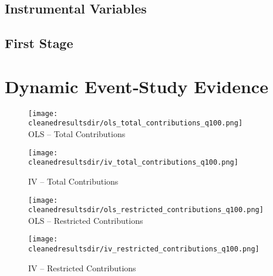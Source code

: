 \documentclass{article}
\newcommand{\cleanedresultsdir}{../results/cleaned}
\begin{document}
\subsection{Instrumental Variables}


\subsection{First Stage}



\clearpage
\section{Dynamic Event‐Study Evidence}


\begin{figure}[H]
  \centering
  \texttt{[image: \\cleanedresultsdir/ols\_total\_contributions\_q100.png]}\\[2pt]
  \caption*{OLS – Total Contributions}
  \texttt{[image: \\cleanedresultsdir/iv\_total\_contributions\_q100.png]}\\[2pt]
  \caption*{IV – Total Contributions}
\end{figure}

\clearpage

\begin{figure}[H]
  \centering
  \texttt{[image: \\cleanedresultsdir/ols\_restricted\_contributions\_q100.png]}\\[2pt]
  \caption*{OLS – Restricted Contributions}
  \texttt{[image: \\cleanedresultsdir/iv\_restricted\_contributions\_q100.png]}\\[2pt]
  \caption*{IV – Restricted Contributions}
\end{figure}

\clearpage

\end{document}
